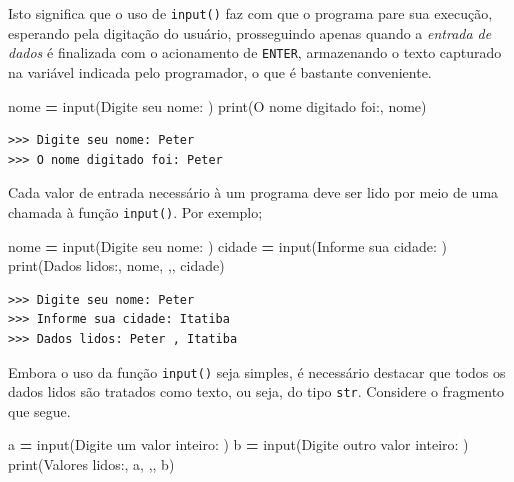\documentclass[
]{book}
\newenvironment{Shaded}{\begin{snugshade}}{\end{snugshade}}
\newcommand{\BuiltInTok}[1]{#1}
\newcommand{\NormalTok}[1]{#1}
\newcommand{\OperatorTok}[1]{\textcolor[rgb]{0.81,0.36,0.00}{\textbf{#1}}}
\newcommand{\StringTok}[1]{\textcolor[rgb]{0.31,0.60,0.02}{#1}}
\begin{document}
Isto significa que o uso de \texttt{input()} faz com que o programa pare sua execução, esperando pela digitação do usuário, prosseguindo apenas quando a \emph{entrada de dados} é finalizada com o acionamento de \texttt{ENTER}, armazenando o texto capturado na variável indicada pelo programador, o que é bastante conveniente.

\begin{Shaded}
\begin{Highlighting}[]
\NormalTok{nome }\OperatorTok{=} \BuiltInTok{input}\NormalTok{(}\StringTok{\textquotesingle{}Digite seu nome: \textquotesingle{}}\NormalTok{)}
\BuiltInTok{print}\NormalTok{(}\StringTok{\textquotesingle{}O nome digitado foi:\textquotesingle{}}\NormalTok{, nome)}
\end{Highlighting}
\end{Shaded}

\begin{verbatim}
>>> Digite seu nome: Peter
>>> O nome digitado foi: Peter
\end{verbatim}

Cada valor de entrada necessário à um programa deve ser lido por meio de uma chamada à função \texttt{input()}. Por exemplo;

\begin{Shaded}
\begin{Highlighting}[]
\NormalTok{nome }\OperatorTok{=} \BuiltInTok{input}\NormalTok{(}\StringTok{\textquotesingle{}Digite seu nome: \textquotesingle{}}\NormalTok{)}
\NormalTok{cidade }\OperatorTok{=} \BuiltInTok{input}\NormalTok{(}\StringTok{\textquotesingle{}Informe sua cidade: \textquotesingle{}}\NormalTok{)}
\BuiltInTok{print}\NormalTok{(}\StringTok{\textquotesingle{}Dados lidos:\textquotesingle{}}\NormalTok{, nome, }\StringTok{\textquotesingle{},\textquotesingle{}}\NormalTok{, cidade)}
\end{Highlighting}
\end{Shaded}

\begin{verbatim}
>>> Digite seu nome: Peter
>>> Informe sua cidade: Itatiba
>>> Dados lidos: Peter , Itatiba
\end{verbatim}

Embora o uso da função \texttt{input()} seja simples, é necessário destacar que todos os dados lidos são tratados como texto, ou seja, do tipo \texttt{str}. Considere o fragmento que segue.

\begin{Shaded}
\begin{Highlighting}[]
\NormalTok{a }\OperatorTok{=} \BuiltInTok{input}\NormalTok{(}\StringTok{\textquotesingle{}Digite um valor inteiro: \textquotesingle{}}\NormalTok{)}
\NormalTok{b }\OperatorTok{=} \BuiltInTok{input}\NormalTok{(}\StringTok{\textquotesingle{}Digite outro valor inteiro: \textquotesingle{}}\NormalTok{)}
\BuiltInTok{print}\NormalTok{(}\StringTok{\textquotesingle{}Valores lidos:\textquotesingle{}}\NormalTok{, a, }\StringTok{\textquotesingle{},\textquotesingle{}}\NormalTok{, b)}
\end{Highlighting}
\end{Shaded}
\end{document}
